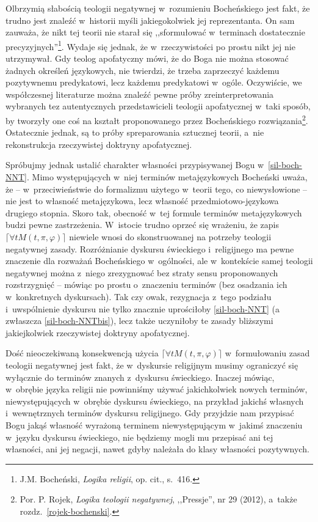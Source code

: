 Olbrzymią słabością teologii negatywnej w~rozumieniu Bocheńskiego jest fakt, że trudno jest znaleźć w~historii myśli jakiegokolwiek jej reprezentanta. On sam zauważa, że nikt tej teorii nie starał się ,,sformułować w~terminach dostatecznie precyzyjnych''\footnote{J.M. Bocheński, \textit{Logika religii}, op. cit., s.~416.}. Wydaje się jednak, że w~rzeczywistości po prostu nikt jej nie utrzymywał. Gdy teolog apofatyczny mówi, że do Boga nie można stosować żadnych określeń językowych, nie twierdzi, że trzeba zaprzeczyć każdemu pozytywnemu predykatowi, lecz każdemu predykatowi w~ogóle. Oczywiście, we współczesnej literaturze można znaleźć pewne próby zreinterpretowania wybranych tez autentycznych przedstawicieli teologii apofatycznej w~taki sposób, by tworzyły one coś na kształt proponowanego przez Bocheńskiego rozwiązania\footnote{Por. P. Rojek, \textit{Logika teologii negatywnej}, ,,Pressje'', nr 29 (2012), a~także rozdz.~\ref{rojek-bochenski}.}. Ostatecznie jednak, są to próby spreparowania sztucznej teorii, a~nie rekonstrukcja rzeczywistej doktryny apofatycznej.

Spróbujmy jednak ustalić charakter własności przypisywanej Bogu w~\ref{sil-boch-NNT}. Mimo występujących w~niej terminów metajęzykowych Bocheński uważa, że -- w~przeciwieństwie do formalizmu użytego w~teorii tego, co niewysłowione -- nie jest to własność metajęzykowa, lecz własność przedmiotowo-językowa drugiego stopnia. Skoro tak, obecność w~tej formule terminów metajęzykowych budzi pewne zastrzeżenia. W~istocie trudno oprzeć się wrażeniu, że zapis $\lceil \forall t M(t,\pi,\varphi) \rceil$  niewiele wnosi do skonstruowanej na potrzeby teologii negatywnej zasady. Rozróżnianie dyskursu świeckiego i~religijnego ma pewne znaczenie dla rozważań Bocheńskiego w~ogólności, ale w~kontekście samej teologii negatywnej można z~niego zrezygnować bez straty sensu proponowanych rozstrzygnięć -- mówiąc po prostu o~znaczeniu terminów (bez osadzania ich w~konkretnych dyskursach). Tak czy owak, rezygnacja z~tego podziału i~uwspólnienie dyskursu nie tylko znacznie uprościłoby \ref{sil-boch-NNT} (a zwłaszcza \ref{sil-boch-NNTbis}), lecz także uczyniłoby te zasady bliższymi jakiejkolwiek rzeczywistej doktryny apofatycznej.

Dość nieoczekiwaną konsekwencją użycia $\lceil \forall t M(t,\pi,\varphi) \rceil$ w~formułowaniu zasad teologii negatywnej jest fakt, że w~dyskursie religijnym musimy ograniczyć się wyłącznie do terminów znanych z~dyskursu świeckiego. Inaczej mówiąc, w~obrębie języka religii nie powinniśmy używać jakichkolwiek nowych terminów, niewystępujących w~obrębie dyskursu świeckiego, na przykład jakichś własnych i~wewnętrznych terminów dyskursu religijnego. Gdy przyjdzie nam przypisać Bogu jakąś własność wyrażoną terminem niewystępującym w~jakimś znaczeniu w~języku dyskursu świeckiego, nie będziemy mogli mu przepisać ani tej własności, ani jej negacji, nawet gdyby należała do klasy własności pozytywnych.

